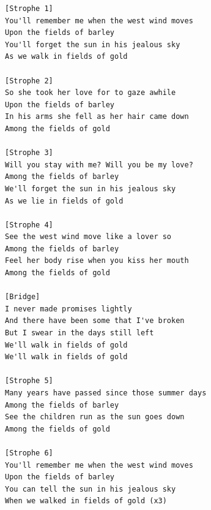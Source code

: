 \begin{small}
\begin{verbatim}
[Strophe 1]
You'll remember me when the west wind moves
Upon the fields of barley
You'll forget the sun in his jealous sky
As we walk in fields of gold

[Strophe 2]
So she took her love for to gaze awhile
Upon the fields of barley
In his arms she fell as her hair came down
Among the fields of gold

[Strophe 3]
Will you stay with me? Will you be my love?
Among the fields of barley
We'll forget the sun in his jealous sky
As we lie in fields of gold

[Strophe 4]
See the west wind move like a lover so
Among the fields of barley
Feel her body rise when you kiss her mouth
Among the fields of gold

[Bridge]
I never made promises lightly
And there have been some that I've broken
But I swear in the days still left
We'll walk in fields of gold
We'll walk in fields of gold

[Strophe 5]
Many years have passed since those summer days
Among the fields of barley
See the children run as the sun goes down
Among the fields of gold

[Strophe 6]
You'll remember me when the west wind moves
Upon the fields of barley
You can tell the sun in his jealous sky
When we walked in fields of gold (x3)
\end{verbatim}
\end{small}